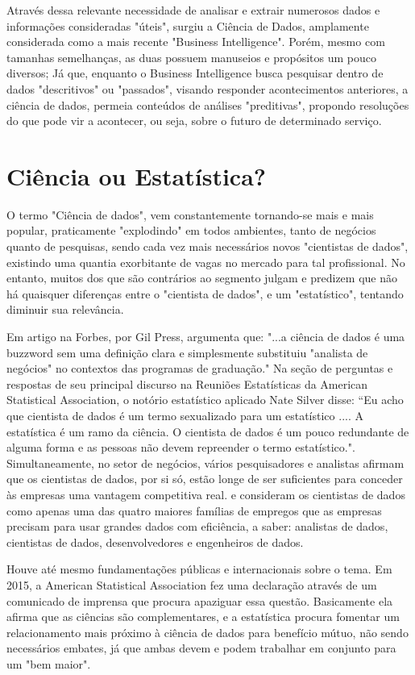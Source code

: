 \documentclass[12pt]{article}
\begin{document}
Através dessa relevante necessidade de analisar e extrair numerosos dados e informações consideradas "úteis", surgiu a Ciência de Dados, amplamente considerada como a mais recente "Business Intelligence". Porém, mesmo com tamanhas semelhanças, as duas possuem manuseios e propósitos um pouco diversos; Já que, enquanto o Business Intelligence busca pesquisar dentro de dados "descritivos" ou "passados", visando responder acontecimentos anteriores, a ciência de dados, permeia conteúdos de análises "preditivas", propondo resoluções do que pode vir a acontecer, ou seja, sobre o futuro de determinado serviço.

\section{Ciência ou Estatística?} \label{sec:firstpage}

O termo "Ciência de dados", vem constantemente tornando-se mais e mais popular, praticamente "explodindo" em todos ambientes, tanto de negócios quanto de pesquisas, sendo cada vez mais necessários novos "cientistas de dados", existindo uma quantia exorbitante de vagas no mercado para tal profissional. No entanto, muitos dos que são contrários ao segmento julgam e predizem que não há quaisquer diferenças entre o "cientista de dados", e um "estatístico", tentando diminuir sua relevância.

Em artigo na Forbes, por Gil Press, argumenta que: "...a ciência de dados é uma buzzword sem uma definição clara e simplesmente substituiu "analista de negócios" no contextos das programas de graduação." Na seção de perguntas e respostas de seu principal discurso na Reuniões Estatísticas da American Statistical Association, o notório estatístico aplicado Nate Silver disse: “Eu acho que cientista de dados é um termo sexualizado para um estatístico .... A estatística é um ramo da ciência. O cientista de dados é um pouco redundante de alguma forma e as pessoas não devem repreender o termo estatístico.". Simultaneamente, no setor de negócios, vários pesquisadores e analistas afirmam que os cientistas de dados, por si só, estão longe de ser suficientes para conceder às empresas uma vantagem competitiva real. e consideram os cientistas de dados como apenas uma das quatro maiores famílias de empregos que as empresas precisam para usar grandes dados com eficiência, a saber: analistas de dados, cientistas de dados, desenvolvedores e engenheiros de dados.

Houve até mesmo fundamentações públicas e internacionais sobre o tema. Em 2015, a American Statistical Association fez uma declaração através de um comunicado de imprensa que procura apaziguar essa questão. Basicamente ela afirma que as ciências são complementares, e a estatística procura fomentar um relacionamento mais próximo à ciência de dados para benefício mútuo, não sendo necessários embates, já que ambas devem e podem trabalhar em conjunto para um "bem maior". 
\end{document}
